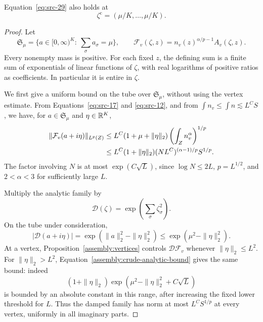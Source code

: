 \begin{lemma}
\label{assembly:interpolation}
Equation~\eqref{eq:src-29} also holds at
\[
 \zeta^{\mathrm c}=(\mu/K,\ldots,\mu/K).
\]
\end{lemma}

\begin{proof}
Let
\[
 \mathfrak S_\mu
 =\{a\in[0,\infty)^K:\ \textstyle\sum_\sigma a_\sigma=\mu\},
 \qquad
 \mathcal F_v(\zeta,z)=n_v(z)^{\alpha/p-1}A_v(\zeta,z).
\]
Every nonempty mass is positive.  For each fixed \(z\), the defining
sum is a finite sum of exponentials of linear functions of \(\zeta\),
with real logarithms of positive ratios as coefficients.  In
particular it is entire in \(\zeta\).

We first give a uniform bound on the tube over
\(\mathfrak S_\mu\), without using the vertex estimate.  From
Equations~\eqref{eq:src-17} and \eqref{eq:src-12}, and from
\(\int n_v\le\int n\lesssim L^C S\), we have, for
\(a\in\mathfrak S_\mu\) and \(\eta\in\mathbb R^K\),
\begin{align}
 \|\mathcal F_v(a+i\eta)\|_{L^p(Z)}
 &\le L^C(1+\mu+\|\eta\|_2)
           \left(\int_Z n_v^\alpha\right)^{1/p}\notag\\
 &\le L^C(1+\|\eta\|_2)
          (NL^C)^{(\alpha-1)/p}S^{1/p}.
 \label{assembly:crude-analytic-bound}
\end{align}
The factor involving \(N\) is at most \(\exp(C\sqrt L)\), since
\(\log N\le2L\), \(p=L^{1/2}\), and \(2<\alpha<3\) for
sufficiently large \(L\).

Multiply the analytic family by
\[
 \mathcal D(\zeta)=\exp\left(\sum_\sigma\zeta_\sigma^2\right).
\]
On the tube under consideration,
\[
 |\mathcal D(a+i\eta)|
       =\exp(\|a\|_2^2-\|\eta\|_2^2)
       \le\exp(\mu^2-\|\eta\|_2^2).
\]
At a vertex, Proposition~\ref{assembly:vertices} controls
\(\mathcal D\mathcal F_v\) whenever \(\|\eta\|_2\le L^2\).
For \(\|\eta\|_2>L^2\),
Equation~\eqref{assembly:crude-analytic-bound} gives the same bound:
indeed
\[
 (1+\|\eta\|_2)
  \exp(\mu^2-\|\eta\|_2^2+C\sqrt L)
\]
is bounded by an absolute constant in this range, after increasing the
fixed lower threshold for \(L\).  Thus the damped family has norm at
most \(L^C S^{1/p}\) at every vertex, uniformly in all imaginary
parts.


\end{proof}

